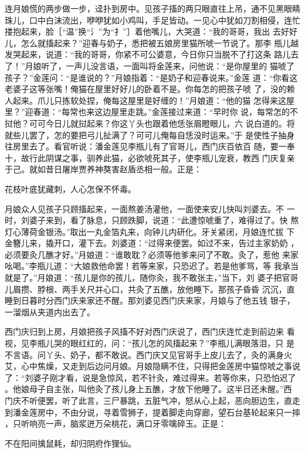 连月娘慌的两步做一步，迳扑到房中。见孩子搐的两只眼直往上吊，通不见黑眼睛
珠儿，口中白沫流出，咿咿犹如小鸡叫，手足皆动。一见心中犹如刀割相侵，连忙
搂抱起来，脸［“温”换“氵”为“扌”］着他嘴儿，大哭道：“我的哥哥，我出
去好好儿，怎么就搐起来？”迎春与奶子，悉把被五娘房里猫所唬一节说了。那李
瓶儿越发哭起来，说道：“我的哥哥，你紧不可公婆意，今日你只当脱不了打这条
路儿去了！”月娘听了，一声儿没言语，一面叫将金莲来，问他说：“是你屋里的
猫唬了孩子？”金莲问：“是谁说的？”月娘指着：“是奶子和迎春说来。”金莲
道：“你看这老婆子这等张嘴！俺猫在屋里好好儿的卧着不是。你每怎的把孩子唬
了，没的赖人起来。爪儿只拣软处捏，俺每这屋里是好缠的！”月娘道：“他的猫
怎得来这屋里？”迎春道：“每常也来这边屋里走跳。”金莲接过来道：“早时你
说，每常怎的不挝他？可可今日儿就挝起来？你这丫头也跟着他恁张眉瞪眼儿，六
说白道的。将就些儿罢了，怎的要把弓儿扯满了？可可儿俺每自恁没时运来。”于
是使性子抽身往房里去了。看官听说：潘金莲见李瓶儿有了官哥儿，西门庆百依百
随，要一奉十，故行此阴谋之事，驯养此猫，必欲唬死其子，使李瓶儿宠衰，教西
门庆复亲于己。就如昔日屠岸贾养神獒害赵盾丞相一般。正是：

花枝叶底犹藏刺，人心怎保不怀毒。

月娘众人见孩子只顾搐起来，一面熬姜汤灌他，一面使来安儿快叫刘婆去。不
一时，刘婆子来到，看了脉息，只顾跌脚，说道：“此遭惊唬重了，难得过了。快
熬灯心薄荷金银汤。”取出一丸金箔丸来，向钟儿内研化。牙关紧闭，月娘连忙拔
下金簪儿来，撬开口，灌下去。刘婆道：“过得来便罢。如过不来，告过主家奶奶
，必须要灸几醮才好。”月娘道：“谁敢耽？必须等他爹来问了不敢。灸了，惹他
来家吆喝。”李瓶儿道：“大娘救他命罢！若等来家，只恐迟了。若是他爹骂，等
我承当就是了。”月娘道：“孩儿是你的孩儿，随你灸，我不敢张主，”当下，刘
婆子把官哥儿眉攒、脖根、两手关尺并心口，共灸了五醮，放他睡下。那孩子昏昏
沉沉，直睡到日暮时分西门庆来家还不醒。那刘婆见西门庆来家，月娘与了他五钱
银子，一溜烟从夹道内出去了。

西门庆归到上房，月娘把孩子风搐不好对西门庆说了，西门庆连忙走到前边来
看视，见李瓶儿哭的眼红红的，问：“孩儿怎的风搐起来？”李瓶儿满眼落泪，只
是不言语。问丫头、奶子，都不敢说。西门庆又见官哥手上皮儿去了，灸的满身火
艾，心中焦燥，又走到后边问月娘。月娘隐瞒不住，只得把金莲房中猫惊唬之事说
了：“刘婆子刚才看，说是急惊风，若不针灸，难过得来。若等你来，只恐怕迟了
。他娘母子自主张，叫他灸了孩儿身上五醮，才放下他睡了。这半日还未醒。”西
门庆不听便罢，听了此言，三尸暴跳，五脏气冲，怒从心上起，恶向胆边生，直走
到潘金莲房中，不由分说，寻着雪狮子，提着脚走向穿廊，望石台基轮起来只一摔
，只听响亮一声，脑浆迸万朵桃花，满口牙零噙碎玉。正是：

不在阳间擒鼠耗，却归阴府作狸仙。

